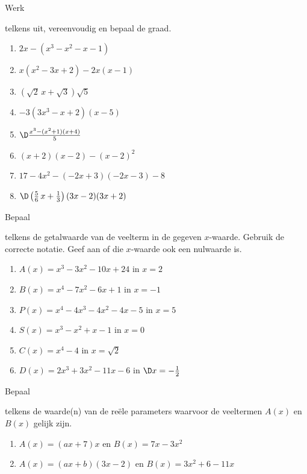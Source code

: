 \documentclass{ximera}
\begin{document}
\begin{Oefening}\setcounter{enumi}{7}
\hypertarget{oef1.7}{Werk} telkens uit, vereenvoudig en bepaal de graad. 
\begin{multicols}{2}
\begin{enumerate}

\item
$2x-(x^3-x^2-x-1)$
\item
$x(x^2-3x+2)-2x(x-1)$
\item
$\left(\sqrt{2}\,x+\sqrt{3}\right)\sqrt{5}$
\item
$-3(3x^3-x+2)(x-5)$
\item
$\D \frac{x^3-(x^2+1)(x+4)}{5}$
\item
$(x+2)(x-2)-(x-2)^2$
\item
$17-4x^2-(-2x+3)(-2x-3)-8$
\item
$\D \left(\frac{5}{6}\,x+\frac{1}{3}\right)(3x-2)(3x+2)$
\end{enumerate}
\end{multicols}
\end{Oefening}

\begin{Oefening}\setcounter{enumi}{8}
\hypertarget{oef1.8}{Bepaal} telkens de getalwaarde van de veelterm in de gegeven $x$-waarde. Gebruik de correcte notatie. Geef aan of die $x$-waarde ook een nulwaarde is. 
\begin{enumerate}

\item
$A(x) = x^3-3x^2-10x+24$ \quad in $x = 2$
\item
$B(x) = x^4-7x^2-6x+1$ \quad in $x = -1$
\item
$P(x) = x^4-4x^3-4x^2-4x-5$ \quad in $x = 5$
\item
$S(x) = x^3-x^2+x-1$ \quad in $x = 0$
\item
$C(x) = x^4-4$ \quad in $x = \sqrt{2}$
\item
$D(x) = 2x^3 + 3x^2 - 11x - 6$ \quad in $\D x = -\frac{1}{2}$
\end{enumerate}
\end{Oefening}

\begin{Oefening}\setcounter{enumi}{9} 
\hypertarget{oef1.9}{Bepaal} telkens de waarde(n) van de re\"ele parameters waarvoor de veeltermen $A(x)$ en $B(x)$ gelijk zijn.
\begin{enumerate}

\item
$A(x) = (ax+7)x$ en $B(x) = 7x-3x^2$ %
\item
$A(x) = (ax+b)(3x-2)$ en $B(x) = 3x^2+6-11x$ %
\end{enumerate}
\end{Oefening}
\end{document}

